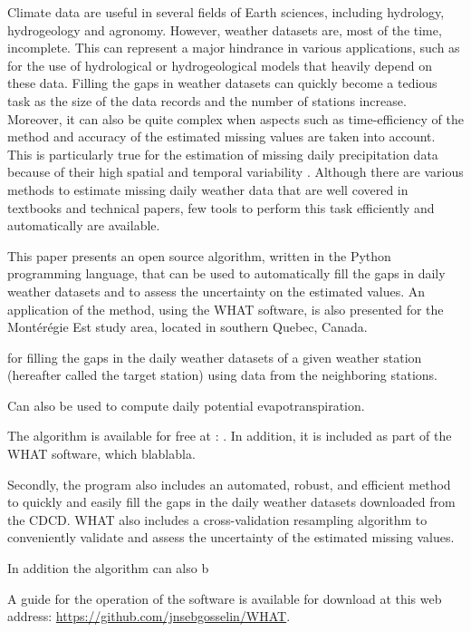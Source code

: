 \documentclass[TechnicalNoteMeteo.tex]{subfiles}
\begin{document}
Climate data are useful in several fields of Earth sciences, including hydrology, hydrogeology and agronomy. However, weather datasets are, most of the time, incomplete. This can represent a major hindrance in various applications, such as for the use of hydrological or hydrogeological models that heavily depend on these data. Filling the gaps in weather datasets can quickly become a tedious task as the size of the data records and the number of stations increase. Moreover, it can also be quite complex when aspects such as time-efficiency of the method and accuracy of the estimated missing values are taken into account. This is particularly true for the estimation of missing daily precipitation data because of their high spatial and temporal variability \citep{simolo_improving_2010}. Although there are various methods to estimate missing daily weather data that are well covered in textbooks and technical papers, few tools to perform this task efficiently and automatically are available.

This paper presents an open source algorithm, written in the Python programming language, that can be used to automatically fill the gaps in daily weather datasets and to assess the uncertainty on the estimated values. An application of the method, using the WHAT software, is also presented for the Mont\'er\'egie Est study area, located in southern Quebec, Canada. 

for filling the gaps in the daily weather datasets of a given weather station (hereafter called the target station) using data from the neighboring stations. 

Can also be used to compute daily potential evapotranspiration.

The algorithm is available for free at : . In addition, it is included as part of the WHAT software, which blablabla.

Secondly, the program also includes an automated, robust, and efficient method to quickly and easily fill the gaps in the daily weather datasets downloaded from the CDCD. WHAT also includes a cross-validation resampling algorithm to conveniently validate and assess the uncertainty of the estimated missing values.

In addition the algorithm can also b


A guide for the operation of the software \cite{gosselin_what_2015} is available for download at this web address: \url{https://github.com/jnsebgosselin/WHAT}.
\end{document}
